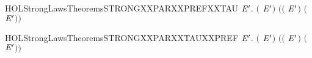 \newcommand{\HOLStrongLawsTheoremsSTRONGXXPARXXPREFXXSYNCR}{\UseVerbatim{HOLStrongLawsTheoremsSTRONGXXPARXXPREFXXSYNCR}}
\begin{SaveVerbatim}{HOLStrongLawsTheoremsSTRONGXXPARXXPREFXXTAU}
\HOLTokenTurnstile{} \HOLSymConst{\HOLTokenForall{}}  \ensuremath{\HOLBoundVar{E}\sp{\prime}}.
        \ensuremath{(}\HOLSymConst{\ensuremath{\ldotp}} \HOLSymConst{\ensuremath{\mid}} \HOLConst{\ensuremath{\tau}}\HOLSymConst{\ensuremath{\ldotp}}\ensuremath{\HOLBoundVar{E}\sp{\prime}}\ensuremath{)} \ensuremath{(}\HOLSymConst{\ensuremath{\ldotp}}\ensuremath{(} \HOLSymConst{\ensuremath{\mid}} \HOLConst{\ensuremath{\tau}}\HOLSymConst{\ensuremath{\ldotp}}\ensuremath{\HOLBoundVar{E}\sp{\prime}}\ensuremath{)} \HOLSymConst{\ensuremath{+}} \HOLConst{\ensuremath{\tau}}\HOLSymConst{\ensuremath{\ldotp}}\ensuremath{(}\HOLSymConst{\ensuremath{\ldotp}} \HOLSymConst{\ensuremath{\mid}} \ensuremath{\HOLBoundVar{E}\sp{\prime}}\ensuremath{)}\ensuremath{)}
\end{SaveVerbatim}
\newcommand{\HOLStrongLawsTheoremsSTRONGXXPARXXPREFXXTAU}{\UseVerbatim{HOLStrongLawsTheoremsSTRONGXXPARXXPREFXXTAU}}
\begin{SaveVerbatim}{HOLStrongLawsTheoremsSTRONGXXPARXXTAUXXPREF}
\HOLTokenTurnstile{} \HOLSymConst{\HOLTokenForall{}}  \ensuremath{\HOLBoundVar{E}\sp{\prime}}.
        \ensuremath{(}\HOLConst{\ensuremath{\tau}}\HOLSymConst{\ensuremath{\ldotp}} \HOLSymConst{\ensuremath{\mid}} \HOLSymConst{\ensuremath{\ldotp}}\ensuremath{\HOLBoundVar{E}\sp{\prime}}\ensuremath{)} \ensuremath{(}\HOLConst{\ensuremath{\tau}}\HOLSymConst{\ensuremath{\ldotp}}\ensuremath{(} \HOLSymConst{\ensuremath{\mid}} \HOLSymConst{\ensuremath{\ldotp}}\ensuremath{\HOLBoundVar{E}\sp{\prime}}\ensuremath{)} \HOLSymConst{\ensuremath{+}} \HOLSymConst{\ensuremath{\ldotp}}\ensuremath{(}\HOLConst{\ensuremath{\tau}}\HOLSymConst{\ensuremath{\ldotp}} \HOLSymConst{\ensuremath{\mid}} \ensuremath{\HOLBoundVar{E}\sp{\prime}}\ensuremath{)}\ensuremath{)}
\end{SaveVerbatim}
\newcommand{\HOLStrongLawsTheoremsSTRONGXXPARXXTAUXXPREF}{\UseVerbatim{HOLStrongLawsTheoremsSTRONGXXPARXXTAUXXPREF}}
